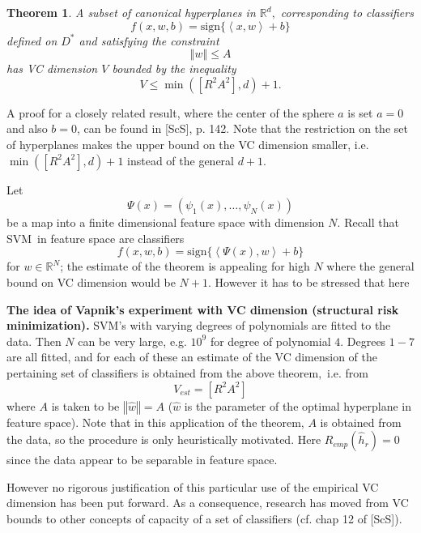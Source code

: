 \documentclass[11pt,twoside]{article}%
\theoremstyle{change}
\newtheorem{theorem}{Theorem}[section]
\begin{document}
\begin{mycomments}
\begin{theorem}
\label{Theor-margin-VC}A subset of canonical hyperplanes in $\mathbb{R}^{d},$
corresponding to classifiers
\[
f(x,w,b)=\mathrm{sign}\{\left\langle x,w\right\rangle +b\}
\]
defined on $D^{\ast}$ and satisfying the constraint
\[
\left\Vert w\right\Vert \leq A
\]
has VC dimension $V$ bounded by the inequality
\[
V\leq\min\left(  \left[  R^{2}A^{2}\right]  ,d\right)  +1.
\]

\end{theorem}

A proof for a closely related result, where the center of the sphere $a$ is
set $a=0$ and also $b=0$, can be found in [ScS], p. 142. Note that the
restriction on the set of hyperplanes makes the upper bound on the VC
dimension smaller, i.e. $\min\left(  \left[  R^{2}A^{2}\right]  ,d\right)  +1$
instead of the general $d+1$.

Let
\[
\Psi(x)=\left(  \psi_{1}(x),\ldots,\psi_{N}(x)\right)
\]
be a map into a finite dimensional feature space with dimension $N$. Recall
that SVM\ in feature space are classifiers
\[
f(x,w,b)=\mathrm{sign}\{\left\langle \Psi(x),w\right\rangle +b\}
\]
for $w\in\mathbb{R}^{N}$; the estimate of the theorem is appealing for high
$N$ where the general bound on VC dimension would be $N+1.$ However it has to
be stressed that here

\textbf{The idea of Vapnik's experiment with VC dimension (structural risk
minimization). }SVM's with varying degrees of polynomials are fitted to the
data. Then $N$ can be very large, e.g. $10^{9}$ for degree of polynomial $4$.
Degrees $1-7$ are all fitted, and for each of these an estimate of the VC
dimension of the pertaining set of classifiers is obtained from the above
theorem$,$ i.e. from
\[
V_{est}=\left[  R^{2}A^{2}\right]
\]
where $A$ is taken to be $\left\Vert \hat{w}\right\Vert =A$ ($\hat{w}$ is the
parameter of the optimal hyperplane in feature space). Note that in this
application of the theorem, $A$ is obtained from the data, so the procedure is
only heuristically motivated. Here $R_{emp}(\hat{h}_{r})=0$ since the data
appear to be separable in feature space.

However no rigorous justification of this particular use of the empirical VC
dimension has been put forward. As a consequence, research has moved from VC
bounds to other concepts of capacity of a set of classifiers (cf. chap 12 of [ScS]).%

\end{mycomments}%
\end{document}
